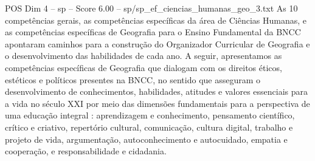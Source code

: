 \begin{textsample}{POS Dim 4 – sp – Score 6.00 – sp/sp\_ef\_ciencias\_humanas\_geo\_3.txt}
As 10 competências gerais, as competências específicas da área de Ciências Humanas, e as competências específicas de Geografia para o Ensino Fundamental da BNCC apontaram caminhos para a construção do Organizador Curricular de Geografia e o desenvolvimento das habilidades de cada ano.
A seguir, apresentamos as competências específicas de Geografia que dialogam com os direitos éticos, estéticos e políticos presentes na BNCC, no sentido que asseguram o desenvolvimento de conhecimentos, habilidades, atitudes e valores essenciais para a vida no século XXI por meio das dimensões fundamentais para a perspectiva de uma educação integral : aprendizagem e conhecimento, pensamento científico, crítico e criativo, repertório cultural, comunicação, cultura digital, trabalho e projeto de vida, argumentação, autoconhecimento e autocuidado, empatia e cooperação, e responsabilidade e cidadania.

\end{textsample}
